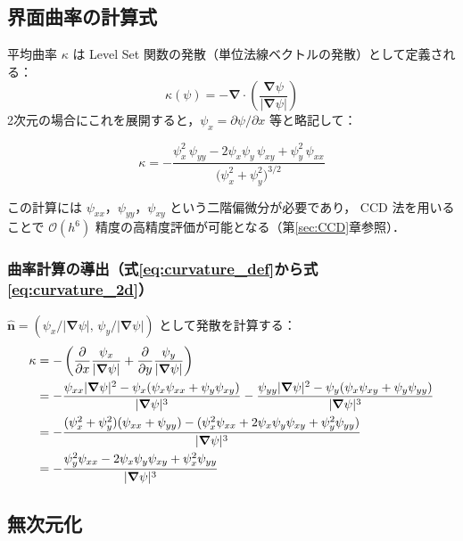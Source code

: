 \documentclass[12pt, a4paper, titlepage, xelatex, ja=standard]{bxjsarticle}
\newcommand{\pd}[2]{\dfrac{\partial #1}{\partial #2}}
\newcommand{\bnabla}{\bm{\nabla}}
\newcommand{\Ord}[1]{\mathcal{O}(#1)}
\begin{document}
\subsection{界面曲率の計算式}

平均曲率 $\kappa$ は Level Set 関数の発散（単位法線ベクトルの発散）として定義される：
\begin{equation}
  \kappa(\psi) = -\bnabla\cdot\!\left(\frac{\bnabla\psi}{|\bnabla\psi|}\right)
  \label{eq:curvature_def}
\end{equation}
2次元の場合にこれを展開すると，$\psi_x = \partial\psi/\partial x$ 等と略記して：
\begin{tcolorbox}[mybox, title={2次元界面曲率（展開形）}]
\begin{equation}
  \kappa = -\frac{
    \psi_x^2\,\psi_{yy}
    - 2\psi_x\psi_y\,\psi_{xy}
    + \psi_y^2\,\psi_{xx}
  }{\bigl(\psi_x^2 + \psi_y^2\bigr)^{3/2}}
  \label{eq:curvature_2d}
\end{equation}
\end{tcolorbox}
この計算には $\psi_{xx}$，$\psi_{yy}$，$\psi_{xy}$ という二階偏微分が必要であり，
CCD 法を用いることで $\Ord{h^6}$ 精度の高精度評価が可能となる（第\ref{sec:CCD}章参照）．

\subsubsection{曲率計算の導出（式\eqref{eq:curvature_def}から式\eqref{eq:curvature_2d}）}

$\hat{\bm{n}} = (\psi_x/|\bnabla\psi|,\, \psi_y/|\bnabla\psi|)$ として発散を計算する：
\begin{align}
  \kappa
  &= -\left(\pd{}{x}\frac{\psi_x}{|\bnabla\psi|} + \pd{}{y}\frac{\psi_y}{|\bnabla\psi|}\right) \notag\\
  &= -\frac{\psi_{xx}|\bnabla\psi|^2 - \psi_x(\psi_x\psi_{xx}+\psi_y\psi_{xy})}{|\bnabla\psi|^3} -\frac{\psi_{yy}|\bnabla\psi|^2 - \psi_y(\psi_x\psi_{xy}+\psi_y\psi_{yy})}{|\bnabla\psi|^3} \notag\\
  &= -\frac{(\psi_x^2+\psi_y^2)(\psi_{xx}+\psi_{yy}) - (\psi_x^2\psi_{xx}+2\psi_x\psi_y\psi_{xy}+\psi_y^2\psi_{yy})}{|\bnabla\psi|^3} \notag\\
  &= -\frac{\psi_y^2\psi_{xx} - 2\psi_x\psi_y\psi_{xy} + \psi_x^2\psi_{yy}}{|\bnabla\psi|^3}
\end{align}

\subsection{無次元化}
\end{document}
